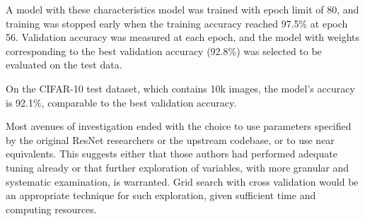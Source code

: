 \documentclass[letterpaper]{article} %
\begin{document}
A model with these characteristics model was trained with epoch limit of 80, and
training was stopped early when the training accuracy reached 97.5\% at epoch 56.
Validation accuracy was measured at each epoch, and the model with weights corresponding to the best
validation accuracy (92.8\%) was selected to be evaluated on the test data.

On the CIFAR-10 test dataset, which contains 10k images, the model's accuracy is 92.1\%,
comparable to the best validation accuracy.

Most avenues of investigation ended with the choice to use parameters specified by the original ResNet researchers or
the upstream codebase, or to use near equivalents.
This suggests either that those authors had performed adequate tuning already or that further exploration of variables,
with more granular and systematic examination, is warranted.
Grid search with cross validation would be an appropriate technique for such exploration, given sufficient time and
computing resources.



\end{document}
